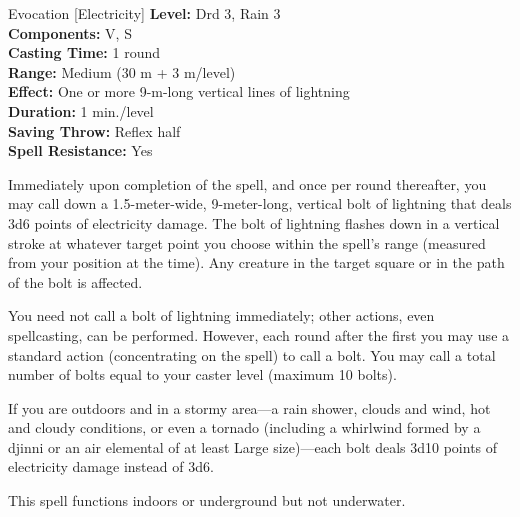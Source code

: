 {Evocation [Electricity]}
{
	\textbf{Level:}
	Drd 3, Rain 3\\
	\textbf{Components:}
	V, S\\
	\textbf{Casting Time:}
	1 round\\
	\textbf{Range:}
	Medium (30 m + 3 m/level)\\
	\textbf{Effect:}
	One or more 9-m-long vertical lines of lightning\\
	\textbf{Duration:}
	1 min./level\\
	\textbf{Saving Throw:}
	Reflex half\\
	\textbf{Spell Resistance:}
	Yes\\
}
{
	Immediately upon completion of the spell, and once per round thereafter, you may call down a 1.5-meter-wide, 9-meter-long, vertical bolt of lightning that deals 3d6 points of electricity damage. The bolt of lightning flashes down in a vertical stroke at whatever target point you choose within the spell's range (measured from your position at the time). Any creature in the target square or in the path of the bolt is affected.

	You need not call a bolt of lightning immediately; other actions, even spellcasting, can be performed. However, each round after the first you may use a standard action (concentrating on the spell) to call a bolt. You may call a total number of bolts equal to your caster level (maximum 10 bolts).

	If you are outdoors and in a stormy area---a rain shower, clouds and wind, hot and cloudy conditions, or even a tornado (including a whirlwind formed by a djinni or an air elemental of at least Large size)---each bolt deals 3d10 points of electricity damage instead of 3d6.

	This spell functions indoors or underground but not underwater.

}
